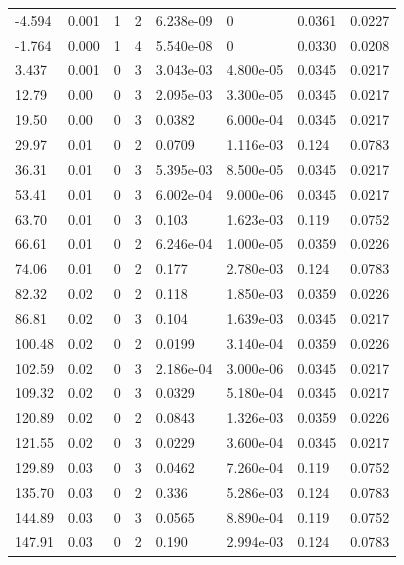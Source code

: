 \documentclass[preview]{standalone}
\begin{document}
{{\begin{tabular}{L{1.2cm}C{1.2cm} C{0.3cm}C{0.5cm} C{1.4cm}C{1.4cm} C{1.4cm}C{1.4cm}}
  -4.594  &  0.001  & 1     &  2 &  6.238e-09  & 0  & 0.0361 &  0.0227   \\ 
  -1.764  &  0.000  & 1     &  4 &  5.540e-08  & 0  & 0.0330 &  0.0208   \\ 
  3.437  &  0.001  & 0     &  3 &  3.043e-03  & 4.800e-05  & 0.0345 &  0.0217   \\ 
  12.79  &  0.00  & 0     &  3 &  2.095e-03  & 3.300e-05  & 0.0345 &  0.0217   \\ 
  19.50  &  0.00  & 0     &  3 &  0.0382  & 6.000e-04  & 0.0345 &  0.0217   \\ 
  29.97  &  0.01  & 0     &  2 &  0.0709  & 1.116e-03  & 0.124 &  0.0783   \\ 
  36.31  &  0.01  & 0     &  3 &  5.395e-03  & 8.500e-05  & 0.0345 &  0.0217   \\ 
  53.41  &  0.01  & 0     &  3 &  6.002e-04  & 9.000e-06  & 0.0345 &  0.0217   \\ 
  63.70  &  0.01  & 0     &  3 &  0.103  & 1.623e-03  & 0.119 &  0.0752   \\ 
  66.61  &  0.01  & 0     &  2 &  6.246e-04  & 1.000e-05  & 0.0359 &  0.0226   \\ 
  74.06  &  0.01  & 0     &  2 &  0.177  & 2.780e-03  & 0.124 &  0.0783   \\ 
  82.32  &  0.02  & 0     &  2 &  0.118  & 1.850e-03  & 0.0359 &  0.0226   \\ 
  86.81  &  0.02  & 0     &  3 &  0.104  & 1.639e-03  & 0.0345 &  0.0217   \\ 
  100.48  &  0.02  & 0     &  2 &  0.0199  & 3.140e-04  & 0.0359 &  0.0226   \\ 
  102.59  &  0.02  & 0     &  3 &  2.186e-04  & 3.000e-06  & 0.0345 &  0.0217   \\ 
  109.32  &  0.02  & 0     &  3 &  0.0329  & 5.180e-04  & 0.0345 &  0.0217   \\ 
  120.89  &  0.02  & 0     &  2 &  0.0843  & 1.326e-03  & 0.0359 &  0.0226   \\ 
  121.55  &  0.02  & 0     &  3 &  0.0229  & 3.600e-04  & 0.0345 &  0.0217   \\ 
  129.89  &  0.03  & 0     &  3 &  0.0462  & 7.260e-04  & 0.119 &  0.0752   \\ 
  135.70  &  0.03  & 0     &  2 &  0.336  & 5.286e-03  & 0.124 &  0.0783   \\ 
  144.89  &  0.03  & 0     &  3 &  0.0565  & 8.890e-04  & 0.119 &  0.0752   \\ 
  147.91  &  0.03  & 0     &  2 &  0.190  & 2.994e-03  & 0.124 &  0.0783   \\ 

\end{tabular}}}
\end{document}
